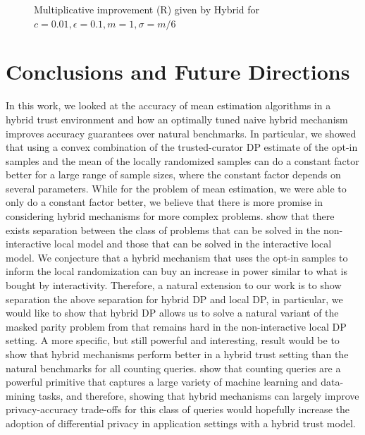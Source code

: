 \documentclass{article}
\theoremstyle{plain}
\begin{document}
\begin{figure}[t]
\begin{minipage}[t]{.49\textwidth}
\caption{Multiplicative improvement (R) given by Hybrid for $c=0.01, \epsilon=0.1, m=1, \sigma = m/6$}
\end{minipage}
\end{figure}

\section{Conclusions and Future Directions}
In this work, we looked at the accuracy of mean estimation algorithms in a hybrid trust environment and how an optimally tuned naive hybrid mechanism improves accuracy guarantees over natural benchmarks. In particular, we showed that using a convex combination of the trusted-curator DP estimate of the opt-in samples and the mean of the locally randomized samples can do a constant factor better for a large range of sample sizes, where the constant factor depends on several parameters. While for the problem of mean estimation, we were able to only do a constant factor better, we believe that there is more promise in considering hybrid mechanisms for more complex problems. \cite{Kasiviswanathan:2011:WLP:2078965.2078976} show that there exists separation between the class of problems that can be solved in the non-interactive local model and those that can be solved in the interactive local model. We conjecture that a hybrid mechanism that uses the opt-in samples to inform the local randomization can buy an increase in power similar to what is bought by interactivity. Therefore, a natural extension to our work is to show separation the above separation for hybrid DP and local DP, in particular, we would like to show that hybrid DP allows us to solve a natural variant of the masked parity problem from \cite{Kasiviswanathan:2011:WLP:2078965.2078976} that remains hard in the non-interactive local DP setting. A more specific, but still powerful and interesting, result would be to show that hybrid mechanisms perform better in a hybrid trust setting than the natural benchmarks for all counting queries. \cite{Blum:2005:PPS:1065167.1065184} show that counting queries are a powerful primitive that captures a large variety of machine learning and data-mining tasks, and therefore, showing that hybrid mechanisms can largely improve privacy-accuracy trade-offs for this class of queries would hopefully increase the adoption of differential privacy in application settings with a hybrid trust model. 

\small


\end{document}
